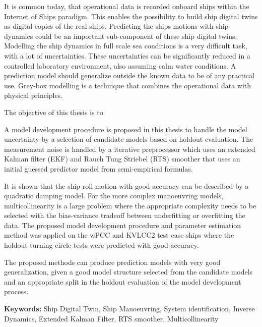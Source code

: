 
It is common today, that operational data is recorded onboard ships within the Internet of Ships paradigm. This enables the possibility to build ship digital twins as digital copies of the real ships. Predicting the ships motions with ship dynamics could be an important sub-component of these ship digital twins. Modelling the ship dynamics in full scale sea conditions is a very difficult task, with a lot of uncertainties. These uncertainties can be significantly reduced in a controlled laboratory environment, also assuming calm water conditions. A prediction model should generalize outside the known data to be of any practical use. Grey-box modelling is a technique that combines the operational data with physical principles.  

The objective of this thesis is to 
\noindent \objective 

A model development procedure is proposed in this thesis to handle the model uncertainty by a selection of candidate models based on holdout evaluation. The measurement noise is handled by a iterative preprocessor which uses an extended Kalman filter (EKF) and Rauch Tung Striebel (RTS) smoother that uses an initial guessed predictor model from semi-empirical formulas.

It is shown that the ship roll motion with good accuracy can be described by a quadratic damping model. For the more complex manoeuvring models, multicollinearity is a large problem where the appropriate complexity needs to be selected with the bias-variance tradeoff between underfitting or overfitting the data. 
The proposed model development procedure and parameter estimation method was applied on the wPCC and KVLCC2 test case ships where the holdout turning circle tests were predicted with good accuracy.

The proposed methods can produce prediction models with very good generalization, given a good model structure selected from the candidate models and an appropriate split in the holdout evaluation of the model development process. 

\vspace{0.1cm}
\textbf{Keywords:} Ship Digital Twin, Ship Manoeuvring, System identification, Inverse Dynamics, Extended Kalman Filter, RTS smoother, Multicollinearity

